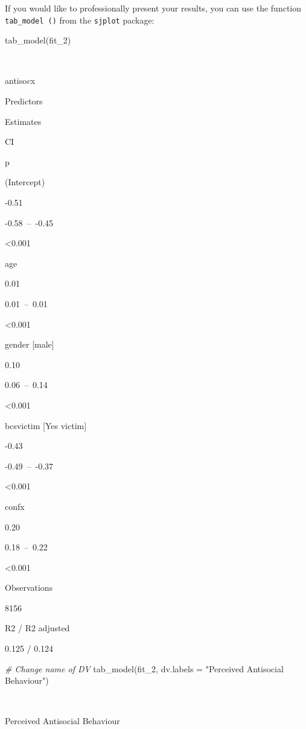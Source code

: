 \documentclass[
]{book}
\newenvironment{Shaded}{\begin{snugshade}}{\end{snugshade}}
\newcommand{\AttributeTok}[1]{\textcolor[rgb]{0.77,0.63,0.00}{#1}}
\newcommand{\CommentTok}[1]{\textcolor[rgb]{0.56,0.35,0.01}{\textit{#1}}}
\newcommand{\FunctionTok}[1]{\textcolor[rgb]{0.00,0.00,0.00}{#1}}
\newcommand{\NormalTok}[1]{#1}
\newcommand{\StringTok}[1]{\textcolor[rgb]{0.31,0.60,0.02}{#1}}
\begin{document}
If you would like to professionally present your results, you can use the function \texttt{tab\_model\ ()} from the \texttt{sjplot} package:

\begin{Shaded}
\begin{Highlighting}[]
\FunctionTok{tab\_model}\NormalTok{(fit\_2)}
\end{Highlighting}
\end{Shaded}

~

antisocx

Predictors

Estimates

CI

p

(Intercept)

-0.51

-0.58~--~-0.45

\textless0.001

age

0.01

0.01~--~0.01

\textless0.001

gender {[}male{]}

0.10

0.06~--~0.14

\textless0.001

bcsvictim {[}Yes victim{]}

-0.43

-0.49~--~-0.37

\textless0.001

confx

0.20

0.18~--~0.22

\textless0.001

Observations

8156

R2 / R2 adjusted

0.125 / 0.124

\begin{Shaded}
\begin{Highlighting}[]
\CommentTok{\# Change name of DV}
\FunctionTok{tab\_model}\NormalTok{(fit\_2, }\AttributeTok{dv.labels =} \StringTok{"Perceived Antisocial Behaviour"}\NormalTok{)}
\end{Highlighting}
\end{Shaded}

~

Perceived Antisocial Behaviour
\end{document}
